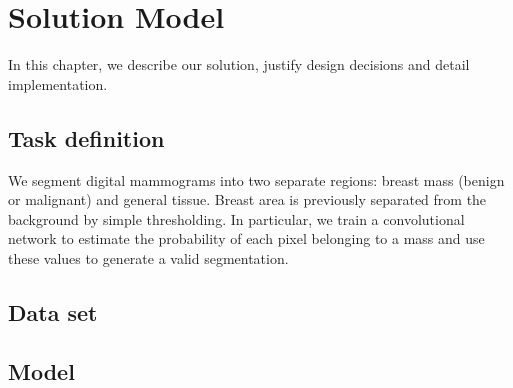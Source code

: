 \chapter{Solution Model}
\label{ch:Model}

In this chapter, we describe our solution, justify design decisions and detail implementation.



\section{Task definition}
We segment digital mammograms into two separate regions: breast mass (benign or malignant) and general tissue.
Breast area is previously separated from the background by simple thresholding.
In particular, we train a convolutional network to estimate the probability of each pixel belonging to a mass and use these values to generate a valid segmentation.

\section{Data set}


\section{Model}

